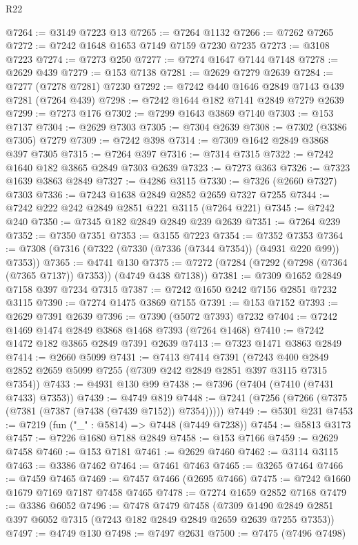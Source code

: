 \begin{lexlean}{R22}
\begin{coremodule}
@7264 := @3149 @7223 @13
@7265 := @7264 @1132
@7266 := @7262 @7265
@7272 := @7242 @1648 @1653 @7149 @7159 @7230 @7235
@7273 := @3108 @7223
@7274 := @7273 @250
@7277 := @7274 @1647 @7144 @7148
@7278 := @2629 @439
@7279 := @153 @7138
@7281 := @2629 @7279 @2639
@7284 := @7277 (@7278 @7281) @7230
@7292 := @7242 @440 @1646 @2849 @7143 @439 @7281 (@7264 @439)
@7298 := @7242 @1644 @182 @7141 @2849 @7279 @2639
@7299 := @7273 @176
@7302 := @7299 @1643 @3869 @7140
@7303 := @153 @7137
@7304 := @2629 @7303
@7305 := @7304 @2639
@7308 := @7302 (@3386 @7305) @7279
@7309 := @7242 @398
@7314 := @7309 @1642 @2849 @3868 @397 @7305
@7315 := @7264 @397
@7316 := @7314 @7315
@7322 := @7242 @1640 @182 @3865 @2849 @7303 @2639
@7323 := @7273 @363
@7326 := @7323 @1639 @3863 @2849
@7327 := @4286 @3115
@7330 := @7326 (@2660 @7327) @7303
@7336 := @7243 @1638 @2849 @2852 @2659 @7327 @7255
@7344 := @7242 @222 @242 @2849 @2851 @221 @3115 (@7264 @221)
@7345 := @7242 @240
@7350 := @7345 @182 @2849 @2849 @239 @2639
@7351 := @7264 @239
@7352 := @7350 @7351
@7353 := @3155 @7223
@7354 := @7352 @7353
@7364 := @7308 (@7316 (@7322 (@7330 (@7336 (@7344 @7354)) (@4931 @220 @99)) @7353))
@7365 := @4741 @130
@7375 := @7272 (@7284 (@7292 (@7298 (@7364 (@7365 @7137)) @7353)) (@4749 @438 @7138))
@7381 := @7309 @1652 @2849 @7158 @397 @7234 @7315
@7387 := @7242 @1650 @242 @7156 @2851 @7232 @3115
@7390 := @7274 @1475 @3869 @7155
@7391 := @153 @7152
@7393 := @2629 @7391 @2639
@7396 := @7390 (@5072 @7393) @7232
@7404 := @7242 @1469 @1474 @2849 @3868 @1468 @7393 (@7264 @1468)
@7410 := @7242 @1472 @182 @3865 @2849 @7391 @2639
@7413 := @7323 @1471 @3863 @2849
@7414 := @2660 @5099
@7431 := @7413
    @7414
    @7391
    (@7243 @400 @2849 @2852 @2659 @5099 @7255 (@7309 @242 @2849 @2851 @397 @3115 @7315 @7354))
@7433 := @4931 @130 @99
@7438 := @7396 (@7404 (@7410 (@7431 @7433) @7353))
@7439 := @4749 @819
@7448 := @7241 (@7256 (@7266 (@7375 (@7381 (@7387 (@7438 (@7439 @7152)) @7354)))))
@7449 := @5301 @231
@7453 := @7219 (fun ("_" : @5814) => @7448 (@7449 @7238))
@7454 := @5813 @3173
@7457 := @7226 @1680 @7188 @2849
@7458 := @153 @7166
@7459 := @2629 @7458
@7460 := @153 @7181
@7461 := @2629 @7460
@7462 := @3114 @3115
@7463 := @3386 @7462
@7464 := @7461 @7463
@7465 := @3265 @7464
@7466 := @7459 @7465
@7469 := @7457 @7466 (@2695 @7466)
@7475 := @7242 @1660 @1679 @7169 @7187 @7458 @7465
@7478 := @7274 @1659 @2852 @7168
@7479 := @3386 @6052
@7496 := @7478
    @7479
    @7458
    (@7309 @1490 @2849 @2851 @397 @6052 @7315 (@7243 @182 @2849 @2849 @2659 @2639 @7255 @7353))
@7497 := @4749 @130
@7498 := @7497 @2631
@7500 := @7475 (@7496 @7498)

\end{coremodule}
\end{lexlean}
